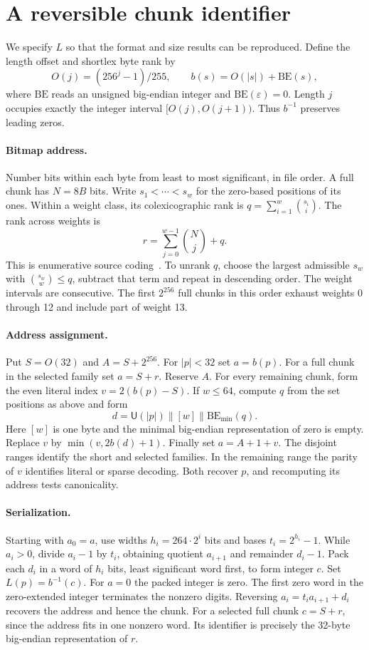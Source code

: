 \documentclass[10pt,twocolumn,letterpaper]{article}
\newcommand{\cat}{\mathbin{\|}}
\newcommand{\len}[1]{\lvert #1\rvert}
\newcommand{\U}{\mathsf{U}}
\newcommand{\eps}{\varepsilon}
\begin{document}
\section{A reversible chunk identifier}\label{sec:leaf}
We specify \(L\) so that the format and size results can be reproduced. Define the length offset and shortlex byte rank by
\[
 O(j)=(256^j-1)/255,\qquad b(s)=O(\len s)+\mathrm{BE}(s),
\]
where \(\mathrm{BE}\) reads an unsigned big-endian integer and \(\mathrm{BE}(\eps)=0\). Length \(j\) occupies exactly the integer interval \([O(j),O(j+1))\). Thus \(b^{-1}\) preserves leading zeros.

\paragraph{Bitmap address.}
Number bits within each byte from least to most significant, in file order. A full chunk has \(N=8B\) bits. Write \(s_1<\cdots<s_w\) for the zero-based positions of its ones. Within a weight class, its colexicographic rank is \(q=\sum_{i=1}^{w}\binom{s_i}{i}\). The rank across weights is
\[
 r=\sum_{j=0}^{w-1}\binom Nj+q .
\]
This is enumerative source coding~\cite{cover}. To unrank \(q\), choose the largest admissible \(s_w\) with \(\binom{s_w}{w}\le q\), subtract that term and repeat in descending order. The weight intervals are consecutive. The first \(2^{256}\) full chunks in this order exhaust weights 0 through 12 and include part of weight 13.

\paragraph{Address assignment.}
Put \(S=O(32)\) and \(A=S+2^{256}\). For \(\len p<32\) set \(a=b(p)\). For a full chunk in the selected family set \(a=S+r\). Reserve \(A\). For every remaining chunk, form the even literal index \(v=2(b(p)-S)\). If \(w\le64\), compute \(q\) from the set positions as above and form
\[
 d=\U(\len p)\cat[w]\cat\mathrm{BE}_{\min}(q).
\]
Here \([w]\) is one byte and the minimal big-endian representation of zero is empty. Replace \(v\) by \(\min(v,2b(d)+1)\). Finally set \(a=A+1+v\). The disjoint ranges identify the short and selected families. In the remaining range the parity of \(v\) identifies literal or sparse decoding. Both recover \(p\), and recomputing its address tests canonicality.

\paragraph{Serialization.}
Starting with \(a_0=a\), use widths \(h_i=264\cdot2^i\) bits and bases \(t_i=2^{h_i}-1\). While \(a_i>0\), divide \(a_i-1\) by \(t_i\), obtaining quotient \(a_{i+1}\) and remainder \(d_i-1\). Pack each \(d_i\) in a word of \(h_i\) bits, least significant word first, to form integer \(c\). Set \(L(p)=b^{-1}(c)\). For \(a=0\) the packed integer is zero. The first zero word in the zero-extended integer terminates the nonzero digits. Reversing \(a_i=t_i a_{i+1}+d_i\) recovers the address and hence the chunk. For a selected full chunk \(c=S+r\), since the address fits in one nonzero word. Its identifier is precisely the 32-byte big-endian representation of \(r\).
\end{document}
